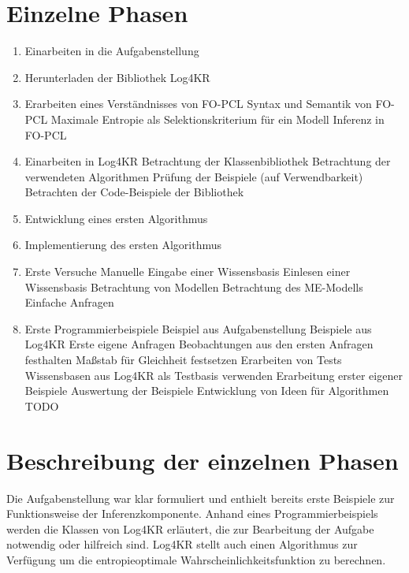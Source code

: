 \documentclass[a4paper, 11pt]{book}
\begin{document}
\section{Einzelne Phasen}

\begin{enumerate}
	\item Einarbeiten in die Aufgabenstellung
	\item Herunterladen der Bibliothek Log4KR
	\item Erarbeiten eines Verständnisses von FO-PCL
	\subitem Syntax und Semantik von FO-PCL
	\subitem Maximale Entropie als Selektionskriterium für ein Modell
	\subitem Inferenz in FO-PCL
	\item Einarbeiten in Log4KR
	\subitem Betrachtung der Klassenbibliothek 
	\subitem Betrachtung der verwendeten Algorithmen
	\subitem Prüfung der Beispiele (auf Verwendbarkeit)
	\subitem Betrachten der Code-Beispiele der Bibliothek
	\item Entwicklung eines ersten Algorithmus
	\item Implementierung des ersten Algorithmus
	\item Erste Versuche 
	\subitem Manuelle Eingabe einer Wissensbasis
	\subitem Einlesen einer Wissensbasis
	\subitem Betrachtung von Modellen
	\subitem Betrachtung des ME-Modells
	\subitem Einfache Anfragen
	\item Erste Programmierbeispiele
	\subitem Beispiel aus Aufgabenstellung
	\subitem Beispiele aus Log4KR
	\subitem Erste eigene Anfragen
	\subitem Beobachtungen aus den ersten Anfragen festhalten
	\subitem Maßstab für Gleichheit festsetzen 
	\subitem Erarbeiten von Tests
	\subitem Wissensbasen aus Log4KR als Testbasis verwenden
	\subitem Erarbeitung erster eigener Beispiele
	\subitem Auswertung der Beispiele
	\subitem Entwicklung von Ideen für Algorithmen
	TODO
	
\end{enumerate}

\section{Beschreibung der einzelnen Phasen}
Die Aufgabenstellung war klar formuliert und enthielt bereits erste Beispiele zur Funktionsweise der Inferenzkomponente. Anhand eines Programmierbeispiels werden die Klassen von Log4KR erläutert, die zur Bearbeitung der Aufgabe notwendig oder hilfreich sind. Log4KR stellt auch einen Algorithmus zur Verfügung um die entropieoptimale Wahrscheinlichkeitsfunktion zu berechnen.
\end{document}
